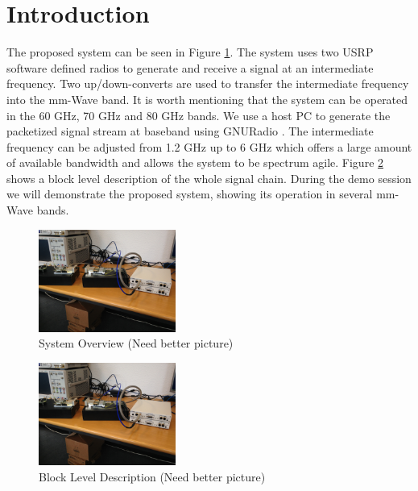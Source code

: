 \documentclass{acm_proc_article-sp}
\begin{document}



\section{Introduction}
The proposed system can be seen in Figure \ref{fig:system}. The system uses two USRP \cite{ettus} software defined radios to generate and receive a signal at an intermediate frequency. Two up/down-converts are used to transfer the intermediate frequency into the mm-Wave band. It is worth mentioning that the system can be operated in the 60 GHz, 70 GHz and 80 GHz bands.
We use a host PC to generate the packetized signal stream at baseband using GNURadio \cite{gnuradio}. The intermediate frequency can be adjusted from 1.2 GHz up to 6 GHz which offers a large amount of available bandwidth and allows the system to be spectrum agile. Figure \ref{fig:block} shows a block level description of the whole signal chain.
During the demo session we will demonstrate the proposed system, showing its operation in several mm-Wave bands.
\begin{figure}
\center
\includegraphics[width=0.4\textwidth]{system.jpg}
\caption{System Overview (Need better picture)}
\label{fig:system}
\end{figure}

\begin{figure}
\center
\includegraphics[width=0.4\textwidth]{system.jpg}
\caption{Block Level Description (Need better picture)}
\label{fig:block}
\end{figure}



\end{document}
